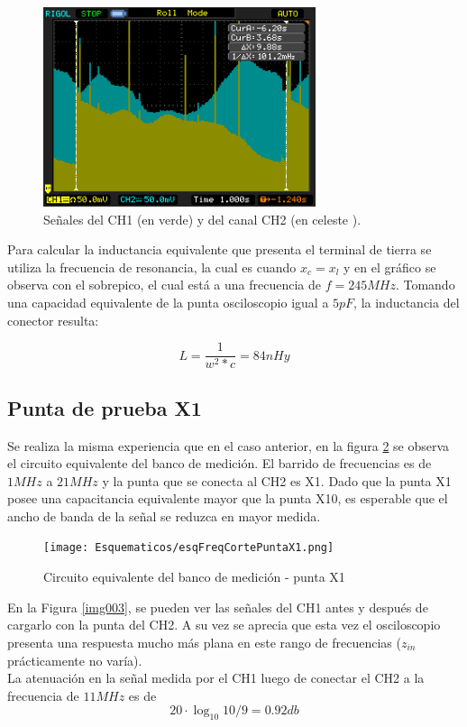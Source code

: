 \documentclass[a4paper,10pt]{article}
\begin{document}
		\begin{figure}[!htb]
			\centering
			\includegraphics[width=8cm]
			{Imagenes/Mediciones instrumentos/NewFile0.png}
			\caption{Se\~nales del CH1 (en verde) y del canal CH2 (en celeste
			).} \label{img000}
		\end{figure}

		\indent Para calcular la inductancia equivalente que presenta el 
		terminal de tierra se utiliza la frecuencia de resonancia, la cual 
		es cuando $x_c = x_l$ y en el gráfico se observa con el sobrepico, el
		cual está a una frecuencia de $f = 245 MHz$. Tomando una capacidad 
		equivalente de la punta osciloscopio igual a $5pF$, la inductancia 
		del conector resulta:

		\begin{equation*}
			 L = \frac{1}{w^2*c} = 84 nHy 
		\end{equation*}

									
		\subsection{Punta de prueba X1}
		\indent Se realiza la misma experiencia que en el caso anterior, en la
		figura \ref{esq002} se observa el circuito equivalente del banco de 
		medición. El barrido de frecuencias es de $1MHz$ a $21MHz$ y la punta
		que se conecta al CH2 es X1. Dado que la punta X1 posee una 
		capacitancia equivalente mayor que la punta X10, es esperable que el 
		ancho de banda de la se\~nal se reduzca en mayor medida. \\

		\begin{figure}[!htb]
			\centering
			\texttt{[image: Esquematicos/esqFreqCortePuntaX1.png]}
			\caption{Circuito equivalente del banco de medición - punta X1} 
			\label{esq002}
		\end{figure}

		\indent En la Figura \ref{img003}, se pueden ver las se\~nales del CH1
		antes y despu\'es de cargarlo con la punta del CH2. A su vez se 
		aprecia que esta vez el osciloscopio presenta una respuesta mucho más
		plana en este rango de frecuencias ($z_{in}$ prácticamente no varía). \\
		\indent La atenuación en la señal medida por el CH1 luego de conectar
		el CH2 a la frecuencia de $11 MHz$ es de 
		$$ 20\cdot \log_{10}10/9 = 0.92db $$
		
\end{document}
